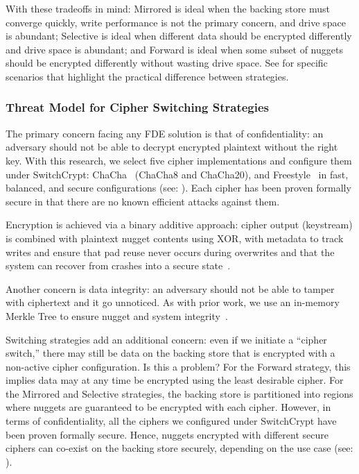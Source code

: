 With these tradeoffs in mind: Mirrored is ideal when the backing store must
converge quickly, write performance is not the primary concern, and drive space
is abundant; Selective is ideal when different data should be encrypted
differently and drive space is abundant; and Forward is ideal when some subset
of nuggets should be encrypted differently without wasting drive space. See
 for specific scenarios that highlight the practical difference
between strategies.

\subsubsection{Threat Model for Cipher Switching Strategies}

The primary concern facing any FDE solution is that of confidentiality: an
adversary should not be able to decrypt encrypted plaintext without the right
key. With this research, we select five cipher implementations and configure
them under SwitchCrypt: ChaCha~\cite{ChaCha20} (ChaCha8 and ChaCha20), and
Freestyle~\cite{Freestyle} in fast, balanced, and secure configurations (see:
). Each cipher has been proven formally secure in that
there are no known efficient attacks against them.

Encryption is achieved via a binary additive approach: cipher output (keystream)
is combined with plaintext nugget contents using XOR, with metadata to track
writes and ensure that pad reuse never occurs during overwrites and that the
system can recover from crashes into a secure state~\cite{StrongBox}.

Another concern is data integrity: an adversary should not be able to tamper
with ciphertext and it go unnoticed. As with prior work, we use an in-memory
Merkle Tree to ensure nugget and system integrity~\cite{StrongBox}.

Switching strategies add an additional concern: even if we initiate a ``cipher
switch,'' there may still be data on the backing store that is encrypted with a
non-active cipher configuration. Is this a problem? For the Forward strategy,
this implies data may at any time be encrypted using the least desirable cipher.
For the Mirrored and Selective strategies, the backing store is partitioned into
regions where nuggets are guaranteed to be encrypted with each cipher. However,
in terms of confidentiality, all the ciphers we configured under SwitchCrypt
have been proven formally secure. Hence, nuggets encrypted with different secure
ciphers can co-exist on the backing store securely, depending on the use case
(see: ).

